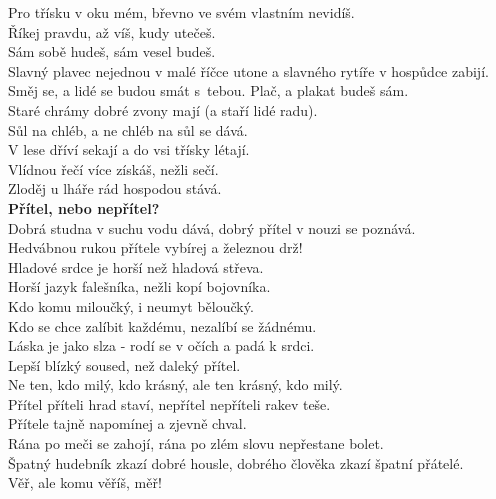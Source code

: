 \begin{multicols}{2}
Pro třísku v oku mém, břevno ve svém vlastním nevidíš.\\
Říkej pravdu, až víš, kudy utečeš.\\
Sám sobě hudeš, sám vesel budeš.\\
Slavný plavec nejednou v malé říčce utone a slavného rytíře v 
hospůdce zabijí.\\
Směj se, a lidé se budou smát s~tebou. Plač, a plakat 
budeš sám.\\
Staré chrámy dobré zvony mají (a staří lidé radu).\\
Sůl na chléb, a ne chléb na sůl se dává.\\
V lese dříví sekají a do vsi třísky létají.\\
Vlídnou řečí více získáš, nežli sečí.\\
Zloděj u lháře rád hospodou stává.\\

\noindent
{\large\bf Přítel, nebo nepřítel?}\\[1 mm]
Dobrá studna v suchu vodu dává, dobrý přítel v nouzi se poznává.\\
Hedvábnou rukou přítele vybírej a železnou drž!\\
Hladové srdce je horší než hladová střeva.\\
Horší jazyk falešníka, nežli kopí bojovníka.\\
Kdo komu miloučký, i neumyt běloučký.\\
Kdo se chce zalíbit každému, nezalíbí se žádnému.\\
Láska je jako slza - rodí se v očích a padá k srdci.\\
Lepší blízký soused, než daleký přítel.\\
Ne ten, kdo milý, kdo krásný, ale ten krásný, kdo milý.\\
Přítel příteli hrad staví, nepřítel nepříteli rakev teše.\\
Přítele tajně napomínej a zjevně chval.\\
Rána po meči se zahojí, rána po zlém slovu nepřestane bolet.\\
Špatný hudebník zkazí dobré housle, dobrého člověka zkazí špatní 
přátelé.\\
Věř, ale komu věříš, měř!\\


\end{multicols}
